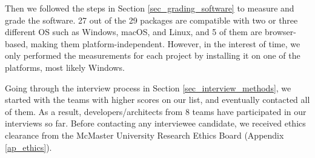 Then we followed the steps in Section \ref{sec_grading_software} to measure and grade the software. 27 out of the 29 packages are compatible with two or three different OS such as Windows, macOS, and Linux, and 5 of them are browser-based, making them platform-independent. However, in the interest of time, we only performed the measurements for each project by installing it on one of the platforms, most likely Windows.

Going through the interview process in Section \ref{sec_interview_methods}, we started with the teams with higher scores on our list, and eventually contacted all of them. As a result, developers/architects from 8 teams have participated in our interviews so far. Before contacting any interviewee candidate, we received ethics clearance from the McMaster University Research Ethics Board (Appendix \ref{ap_ethics}).
